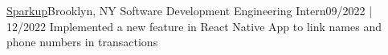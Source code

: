 \resumeSubheading
{\href{https://sparkupbiz.us}{Sparkup}}{Brooklyn, NY}
{Software Development Engineering Intern}{09/2022 | 12/2022}
\resumeItemListStart
{}
{Implemented a new feature in React Native App to link names and phone numbers in transactions}
\resumeItemListEnd
